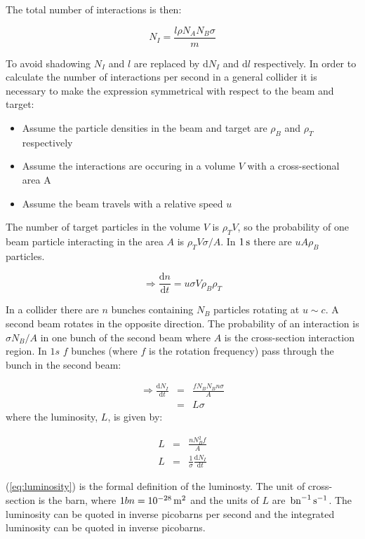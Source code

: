 The total number of interactions is then:

\[
  N_I = \frac{l \rho N_A N_B \sigma}{m}
\]

To avoid shadowing $N_I$ and $l$ are replaced by $\mathrm{d}N_I$ and $\mathrm{d}l$ respectively.  In order to calculate the number of interactions per second in a general collider it is necessary to make the expression symmetrical with respect to the beam and target:
\begin{itemize}
  \item Assume the particle densities in the beam and target are $\rho_B$ and $\rho_T$ respectively
  \item Assume the interactions are occuring in a volume $V$ with a cross-sectional area A
  \item Assume the beam travels with a relative speed $u$
\end{itemize}

The number of target particles in the volume $V$ is $\rho_T V$, so the probability of one beam particle interacting in the area $A$ is $\rho_T V \sigma / A$.  In $1\mathrm{\,s}$ there are $uA\rho_B$ particles.

\[
  \Rightarrow \frac{\mathrm{d}n}{\mathrm{d}t} = u\sigma V \rho_B \rho_T
\]

In a collider there are $n$ bunches containing $N_B$ particles rotating at $u \sim c$.  A second beam rotates in the opposite direction.  The probability of an interaction is $\sigma N_B / A$ in one bunch of the second beam where $A$ is the cross-section interaction region.  In $1s$ $f$ bunches (where $f$ is the rotation frequency) pass through the bunch in the second beam:

\begin{eqnarray*}
  \Rightarrow \frac{\mathrm{d}N_I}{\mathrm{d}t} & = & \frac{f N_B N_B n \sigma}{A} \\
  & = & L \sigma
\end{eqnarray*}
where the luminosity, $L$, is given by:

\begin{eqnarray}
  L & = & \frac{n N^2_B f}{A} \nonumber \\
  L & = & \frac{1}{\sigma}\frac{\mathrm{d}N_I}{\mathrm{d}t} \label{eq:luminosity}
\end{eqnarray}

(\ref{eq:luminosity}) is the formal definition of the luminosty.  The unit of cross-section is the barn, where $1 bn = 10^{-28}\mathrm{\,m}^2$ and the units of $L$ are $\mathrm{\,bn}^{-1}\mathrm{\,s}^{-1}$.  The luminosity can be quoted in inverse picobarns per second and the integrated luminosity can be quoted in inverse picobarns.


